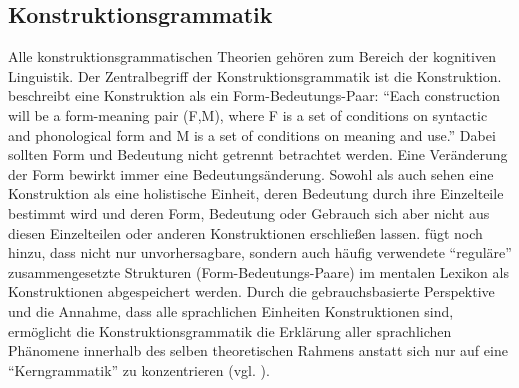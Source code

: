 


\subsection{Konstruktionsgrammatik}
Alle konstruktionsgrammatischen Theorien gehören zum Bereich der kognitiven Linguistik.
Der Zentralbegriff der Konstruktionsgrammatik ist die Konstruktion.
\cite{Lakoff87} beschreibt eine Konstruktion als ein Form-Bedeutungs-Paar:
``Each construction will be a form-meaning pair (F,M), where F is a set of conditions on syntactic and phonological form and M is a set of conditions on meaning and use.''
Dabei sollten Form und Bedeutung nicht getrennt betrachtet werden.
Eine Veränderung der Form bewirkt immer eine Bedeutungsänderung.
Sowohl \cite{Lakoff87} als auch \cite{Goldberg95} sehen eine Konstruktion als eine holistische Einheit, deren Bedeutung durch ihre Einzelteile bestimmt wird und deren Form, Bedeutung oder Gebrauch sich aber nicht aus diesen Einzelteilen oder anderen Konstruktionen erschließen lassen.
\cite{Goldberg06} fügt noch hinzu, dass nicht nur unvorhersagbare, sondern auch häufig verwendete ``reguläre'' zusammengesetzte Strukturen (Form-Bedeutungs-Paare) im mentalen Lexikon als Konstruktionen abgespeichert werden.
Durch die gebrauchsbasierte Perspektive und die Annahme, dass alle sprachlichen Einheiten Konstruktionen sind, ermöglicht die Konstruktionsgrammatik die Erklärung aller sprachlichen Phänomene innerhalb des selben theoretischen Rahmens anstatt sich nur auf eine ``Kerngrammatik'' zu konzentrieren (vgl. \cite{Tomasello06}).


